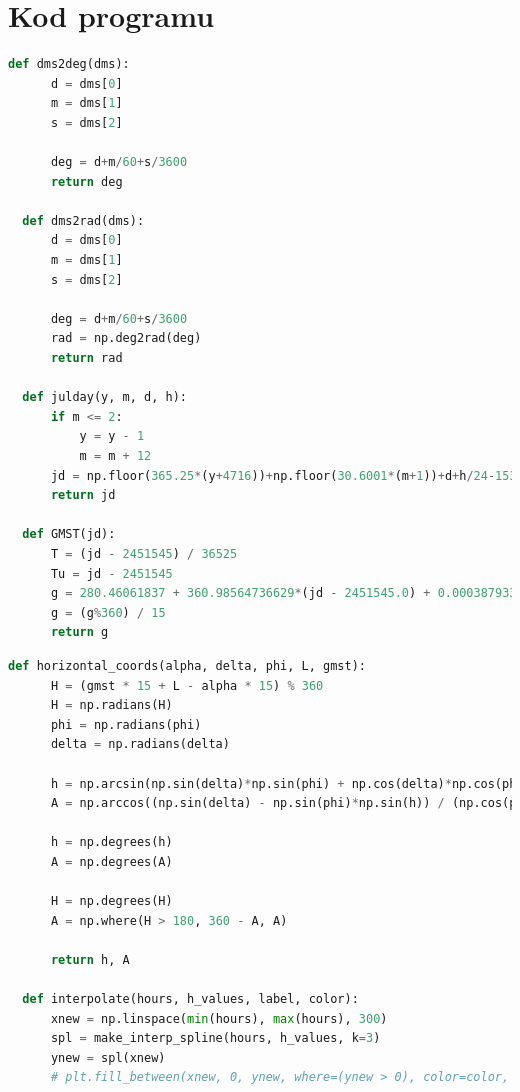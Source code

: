 \documentclass[fleqn,10pt,a4paper]{article}
\begin{document}
\section{Kod programu}

\begin{lstlisting}[language=Python, caption=Funkcje udostępnione przez prowadzącego, label = kod1]
  def dms2deg(dms):
      d = dms[0]
      m = dms[1]
      s = dms[2]
      
      deg = d+m/60+s/3600
      return deg
  
  def dms2rad(dms):
      d = dms[0]
      m = dms[1]
      s = dms[2]
      
      deg = d+m/60+s/3600
      rad = np.deg2rad(deg)
      return rad
  
  def julday(y, m, d, h):
      if m <= 2:
          y = y - 1
          m = m + 12
      jd = np.floor(365.25*(y+4716))+np.floor(30.6001*(m+1))+d+h/24-1537.5
      return jd
  
  def GMST(jd):
      T = (jd - 2451545) / 36525
      Tu = jd - 2451545
      g = 280.46061837 + 360.98564736629*(jd - 2451545.0) + 0.000387933*T**2-T**3/38710000
      g = (g%360) / 15
      return g
\end{lstlisting}
\newpage
\begin{lstlisting}[language=Python, caption=Funkcje własne, label = kod2]
  def horizontal_coords(alpha, delta, phi, L, gmst):
      H = (gmst * 15 + L - alpha * 15) % 360
      H = np.radians(H)
      phi = np.radians(phi)
      delta = np.radians(delta)
  
      h = np.arcsin(np.sin(delta)*np.sin(phi) + np.cos(delta)*np.cos(phi)*np.cos(H))
      A = np.arccos((np.sin(delta) - np.sin(phi)*np.sin(h)) / (np.cos(phi)*np.cos(h)))
  
      h = np.degrees(h)
      A = np.degrees(A)
  
      H = np.degrees(H)
      A = np.where(H > 180, 360 - A, A)
  
      return h, A
  
  def interpolate(hours, h_values, label, color):
      xnew = np.linspace(min(hours), max(hours), 300)
      spl = make_interp_spline(hours, h_values, k=3)
      ynew = spl(xnew)
      # plt.fill_between(xnew, 0, ynew, where=(ynew > 0), color=color, alpha=1, label = label)
  
\end{lstlisting}
\newpage
\end{document}
